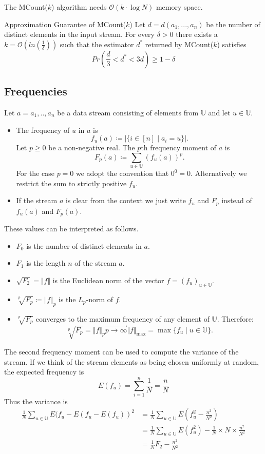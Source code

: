 \documentclass{panikzettel}
\begin{document}
The MCount($k$) algorithm needs $\mathcal{O}(k\cdot \log N)$ memory space.

\begin{theo}{Approximation Guarantee of MCount($k$)}
Let $d=d(a_1,...,a_n)$ be the number of distinct elements in the input stream. For every $\delta > 0$ there exists a $k=\mathcal{O}(ln(\frac{1}{\delta}))$ such that the estimator $d^*$ returned by MCount($k$) satisfies
\[
Pr(\frac{d}{3}<d^* < 3d)\geq 1-\delta
\]
\end{theo}

\subsection{Frequencies}
Let $a=a_1,..,a_n$ be a data stream consisting of elements from $\mathbb{U}$ and let $u\in\mathbb{U}$.
\begin{itemize}
\item The frequency of $u$ in $a$ is
\[
f_u(a)\coloneqq  |\{i \in [n] \mid a_i=u \}|.
\]
Let $p\geq 0$ be a non-negative real. The $p$th frequency moment of $a$ is
\[
F_p(a)\coloneqq \sum_{u\in\mathbb{U}}(f_u(a))^p.
\]
For the case $p=0$ we adopt the convention that $0^0=0$. Alternatively we restrict the sum to strictly positive $f_u$.
\item If the stream $a$ is clear from the context we just write $f_u$ and $F_p$ instead of $f_u(a)$ and $F_p(a)$.
\end{itemize}
These values can be interpreted as follows.
\begin{itemize}
\item $F_0$ is the number of distinct elements in $a$.
\item $F_1$ is the length $n$ of the stream $a$.
\item $\sqrt{F_2}=\Vert f\Vert$ is the Euclidean norm of the vector $f=(f_u)_{u\in \mathbb{U}}$.
\item $\sqrt[p]{F_p}\coloneqq\Vert f \Vert_p$ is the $L_p$-norm of $f$.
\item $\sqrt[p]{F_p}$ converges to the maximum frequency of any element of $\mathbb{U}$. Therefore:
\[
\sqrt[p]{F_p} = \Vert f\Vert_p \overrightarrow{p\to\infty} \Vert f\Vert_{\max} = \max \{ f_u\mid u\in\mathbb{U} \}.
\]
\end{itemize}
The second frequency moment can be used to compute the variance of the stream. If we think of the stream elements as being chosen uniformly at random, the expected frequency is
\[
E(f_u)=\sum_{i=1}^n\frac{1}{N}=\frac{n}{N}
\]
Thus the variance is
\begin{align*}
\frac{1}{N}\sum_{u\in\mathbb{U}}E(f_u-E(f_u-E(f_u))^2 &= \frac{1}{N}\sum_{u\in\mathbb{U}} E(f_u^2-\frac{n^2}{N^2})\\
&= \frac{1}{N}\sum_{u\in\mathbb{U}} E(f_u^2)-\frac{1}{N}\times N\times \frac{n^2}{N^2}\\
&= \frac{1}{N}F_2-\frac{n^2}{N^2}
\end{align*}
\end{document}
